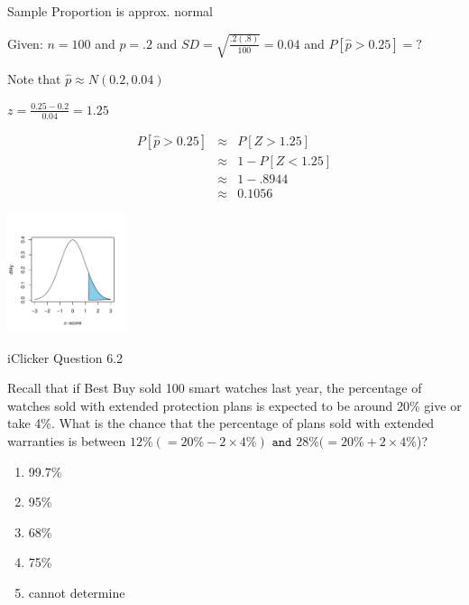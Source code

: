 \documentclass[14pt]{beamer}\usepackage[]{graphicx}\usepackage[]{color}
\begin{document}
\begin{frame}[fragile]{Sample Proportion is approx. normal}

\begin{minipage}[ht]{6cm}

Given: $n = 100$ and $p = .2$ and 
$SD = \sqrt{ \frac{.2(.8)}{100}} = 0.04$ and
$P[ \hat{p} > 0.25] = ?$ 

Note that $\hat{p} \approx N( 0.2, 0.04)$

$z = \frac{0.25 - 0.2}{0.04} = 1.25$

{\small{
\begin{eqnarray*}
P[ \hat{p} > 0.25] & \approx & P[ Z > 1.25] \\
& \approx & 1 - P[Z < 1.25] \\
& \approx & 1 - .8944 \\
& \approx & 0.1056
\end{eqnarray*}
}}
\end{minipage} \hfill
\begin{minipage}[ht]{4cm}


\includegraphics[width=3.5cm]{figure/LBL8a-1} 


\end{minipage}
\end{frame}

\begin{frame}[fragile]{iClicker Question 6.2}

Recall that if Best Buy sold 100 smart watches last year, the percentage of  watches sold with extended protection plans is expected to be around 20\% give or take 4\%.  What is the chance that the percentage of plans sold with extended warranties is between  $12\% (= 20\% - 2 \times 4\%) \texttt{ and } 28\% (=  20\% + 2 \times 4\%$)?

\begin{enumerate}
\item 99.7\%
\item 95\%
\item 68\%
\item 75\%
\item cannot determine
\end{enumerate}
\end{frame}
\end{document}
